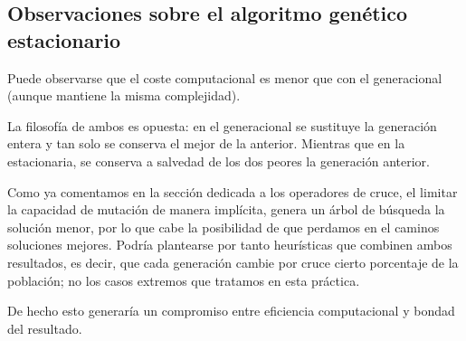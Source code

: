   \subsection{Observaciones sobre el algoritmo genético estacionario }

  Puede observarse que el coste computacional es menor que con el generacional (aunque mantiene la misma complejidad). 

  La filosofía de ambos es opuesta: en el generacional se sustituye la generación entera y tan solo se conserva el mejor de la anterior. 
  Mientras que en la estacionaria, se conserva a salvedad de los dos peores la generación anterior. 

  Como ya comentamos en la sección dedicada a los operadores de cruce, el 
  limitar la capacidad de mutación de manera implícita, genera un árbol de 
  búsqueda la solución menor, por lo que cabe la posibilidad de que 
  perdamos en el caminos soluciones mejores. 
  Podría plantearse por tanto heurísticas que combinen ambos resultados, 
  es decir, que cada generación cambie por cruce cierto porcentaje de la población; no los casos extremos que tratamos en esta práctica. 

  De hecho esto generaría un compromiso entre eficiencia computacional y bondad del resultado. 

